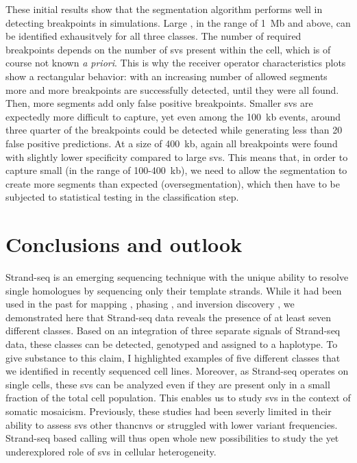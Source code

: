 These initial results show that the segmentation algorithm performs well in
detecting \sv breakpoints in simulations. Large \sv, in the range of 1~Mb and
above, can be identified exhausitvely for all three \sv classes. The number of
required breakpoints depends on the number of \acp{sv} present within the cell,
which is of course not known \emph{a priori}. This is why the receiver operator
characteristics plots show a rectangular behavior: with an increasing number of
allowed segments more and more \sv breakpoints are successfully detected, until
they were all found. Then, more segments add only false positive breakpoints.
Smaller \acp{sv} are expectedly more difficult to capture, yet even among the
100~kb events, around three quarter of the breakpoints could be detected while
generating less than 20 false positive predictions. At a size of 400~kb, again all
breakpoints were found with slightly lower specificity compared to large
\acp{sv}. This means that, in order to capture small \sv (in the range of
100-400~kb), we need to allow the segmentation to create more segments than
expected (oversegmentation), which then have to be subjected to statistical
testing in the classification step.





\section{Conclusions and outlook}
\label{sec:mosaic_conclusion}

Strand-seq is an emerging sequencing technique with the unique ability to
resolve single homologues by sequencing only their template strands. While it
had been used in the past for \sce mapping \citep{Falconer2012}, phasing
\citep{Porubsky2016}, and inversion discovery \citep{Sanders2017}, we
demonstrated here that Strand-seq data reveals the presence of at least seven
different \sv classes. Based on an integration of three separate signals of
Strand-seq data, these \sv classes can be detected, genotyped and assigned to a
haplotype. To give substance to this claim, I highlighted examples of five
different \sv classes that we identified in recently sequenced \rpe cell lines.
Moreover, as Strand-seq operates on single cells, these \acp{sv} can be analyzed
even if they are present only in a small fraction of the total cell population.
This enables us to study \acp{sv} in the context of somatic mosaicism.
Previously, these studies had been severly limited in their ability to assess
\acp{sv} other than\acp{cnv} or struggled with lower variant frequencies.
Strand-seq based \sv calling will thus open whole new possibilities to study
the yet underexplored role of \acp{sv} in cellular heterogeneity.

